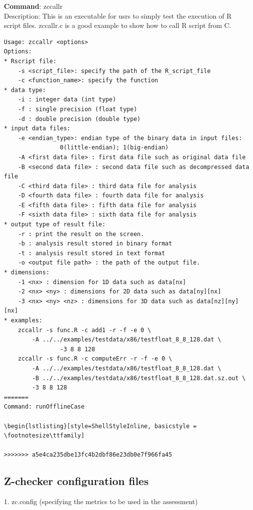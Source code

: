 \textbf{Command}: zccallr\\
Description: This is an executable for usrs to simply test the execution of R script files. zccallr.c is a good example to show how to call R script from C.
\begin{lstlisting}[style=ShellStyleInline, basicstyle = \footnotesize\ttfamily]
Usage: zccallr <options>
Options:
* Rscript file:
	-s <script_file>: specify the path of the R_script_file
	-c <function_name>: specify the function
* data type:
	-i : integer data (int type)
	-f : single precision (float type)
	-d : double precision (double type)
* input data files:
	-e <endian_type>: endian type of the binary data in input files: 
				0(little-endian); 1(big-endian)
	-A <first data file> : first data file such as original data file
	-B <second data file> : second data file such as decompressed data file
	-C <third data file> : third data file for analysis
	-D <fourth data file> : fourth data file for analysis
	-E <fifth data file> : fifth data file for analysis
	-F <sixth data file> : sixth data file for analysis
* output type of result file: 
	-r : print the result on the screen.
	-b : analysis result stored in binary format
	-t : analysis result stored in text format
	-o <output file path> : the path of the output file.
* dimensions: 
	-1 <nx> : dimension for 1D data such as data[nx]
	-2 <nx> <ny> : dimensions for 2D data such as data[ny][nx]
	-3 <nx> <ny> <nz> : dimensions for 3D data such as data[nz][ny][nx] 
* examples: 
	zccallr -s func.R -c add1 -r -f -e 0 \
		-A ../../examples/testdata/x86/testfloat_8_8_128.dat \
				-3 8 8 128
	zccallr -s func.R -c computeErr -r -f -e 0 \
		-A ../../examples/testdata/x86/testfloat_8_8_128.dat \
		-B ../../examples/testdata/x86/testfloat_8_8_128.dat.sz.out \
		-3 8 8 128
=======
Command: runOfflineCase

\begin{lstlisting}[style=ShellStyleInline, basicstyle = \footnotesize\ttfamily]

>>>>>>> a5e4ca235dbe13fc4b2dbf86e23db0e7f966fa45
\end{lstlisting}

\subsection{Z-checker configuration files}

1. zc.config (specifying the metrics to be used in the assessment)

